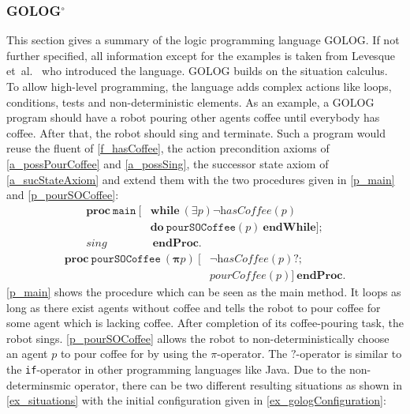 \subsubsection[GOLOG]{GOLOG$^\circ$}\label{fun:apl_golog}
This section gives a summary of the logic programming language GOLOG.
If not further specified, all information except for the examples is taken from Levesque et~al.~\cite{levesque_golog:_1997} who introduced the language.
GOLOG builds on the situation calculus.
To allow high-level programming, the language adds complex actions like loops, conditions, tests and non-deterministic elements.
As an example, a GOLOG program should have a robot pouring other agents coffee until everybody has coffee.
After that, the robot should sing and terminate.
Such a program would reuse the fluent of \autoref{f_hasCoffee}, the action precondition axioms of \autoref{a_possPourCoffee} and \ref{a_possSing}, the successor state axiom of \autoref{a_sucStateAxiom} and extend them with the two procedures given in \autoref{p_main} and \ref{p_pourSOCoffee}:
\begin{equation}\label{p_main}
  \begin{split}
    \textbf{proc}\ \texttt{main}\ [&\textbf{while}\ (\exists p) \neg\textit{hasCoffee}(p) \\
    &\textbf{do}\ \texttt{pourSOCoffee}(p)\ \textbf{endWhile}]; \\
    \textit{sing}&\ \textbf{endProc}.
  \end{split}
\end{equation}
\begin{equation}\label{p_pourSOCoffee}
  \begin{split}
    \textbf{proc}\ \texttt{pourSOCoffee}\ (\boldsymbol{\pi} p)\ [ &\neg\textit{hasCoffee}(p)\textbf{?}; \\
    &\textit{pourCoffee}(p)]\ \textbf{endProc}.
  \end{split}
\end{equation}
\autoref{p_main} shows the procedure which can be seen as the main method.
It loops as long as there exist agents without coffee and tells the robot to pour coffee for some agent which is lacking coffee.
After completion of its coffee-pouring task, the robot sings.
\autoref{p_pourSOCoffee} allows the robot to non-deterministically choose an agent $p$ to pour coffee for by using the $\pi$-operator.
The $?$-operator is similar to the \texttt{if}-operator in other programming languages like Java.
Due to the non-determinsmic operator, there can be two different resulting situations as shown in \autoref{ex_situations} with the initial configuration given in \autoref{ex_gologConfiguration}:
